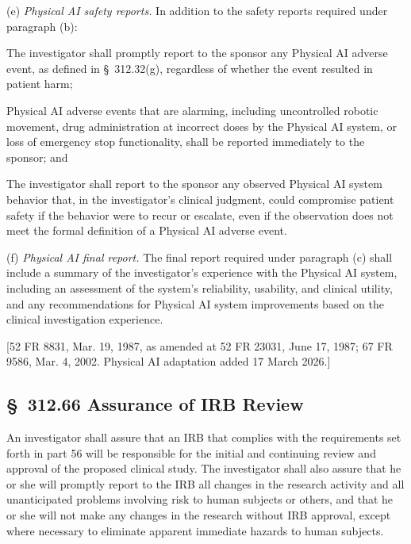 \documentclass[11pt]{article}
\begin{document}
(e) \textit{Physical AI safety reports.} In addition to the safety reports required under paragraph (b):

\begin{description}[leftmargin=0.8cm,style=sameline]
\item[(i)] The investigator shall promptly report to the sponsor any Physical AI adverse event, as defined in \S~312.32(g), regardless of whether the event resulted in patient harm;
\item[(ii)] Physical AI adverse events that are alarming, including uncontrolled robotic movement, drug administration at incorrect doses by the Physical AI system, or loss of emergency stop functionality, shall be reported immediately to the sponsor; and
\item[(iii)] The investigator shall report to the sponsor any observed Physical AI system behavior that, in the investigator's clinical judgment, could compromise patient safety if the behavior were to recur or escalate, even if the observation does not meet the formal definition of a Physical AI adverse event.
\end{description}

(f) \textit{Physical AI final report.} The final report required under paragraph (c) shall include a summary of the investigator's experience with the Physical AI system, including an assessment of the system's reliability, usability, and clinical utility, and any recommendations for Physical AI system improvements based on the clinical investigation experience.

[52 FR 8831, Mar. 19, 1987, as amended at 52 FR 23031, June 17, 1987; 67 FR 9586, Mar. 4, 2002. Physical AI adaptation added 17 March 2026.]

\subsection{\S~312.66 Assurance of IRB Review}

An investigator shall assure that an IRB that complies with the requirements set forth in part 56 will be responsible for the initial and continuing review and approval of the proposed clinical study. The investigator shall also assure that he or she will promptly report to the IRB all changes in the research activity and all unanticipated problems involving risk to human subjects or others, and that he or she will not make any changes in the research without IRB approval, except where necessary to eliminate apparent immediate hazards to human subjects.
\end{document}
